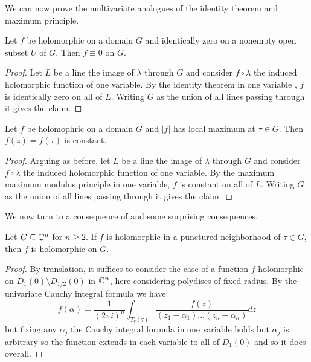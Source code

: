 We can now prove the multivariate analogues of the identity theorem and maximum principle. 
\begin{theorem}\label{thm: multivariate identity}
    Let $f$ be holomorphic on a domain $G$ and identically zero on a nonempty open subset $U$ of $G$. Then $f\equiv0$ on $G$. 
\end{theorem}
\begin{proof}
    Let $L$ be a line the image of $\lambda$ through $G$ and consider $f\circ\lambda$ the induced holomorphic function of one variable. By the identity theorem in one variable , $f$ is identically zero on all of $L$. Writing $G$ as the union of all lines passing through it gives the claim.  
\end{proof}
\begin{theorem}\label{thm: multivariate maximum modulus}
    Let $f$ be holomophric on a domain $G$ and $|f|$ has local maximum at $\tau\in G$. Then $f(z)=f(\tau)$ is constant.
\end{theorem}
\begin{proof}
    Arguing as before, let $L$ be a line the image of $\lambda$ through $G$ and consider $f\circ\lambda$ the induced holomorphic function of one variable. By the maximum maximum modulus principle in one variable, $f$ is constant on all of $L$. Writing $G$ as the union of all lines passing through it gives the claim. 
\end{proof}
We now turn to a consequence of  and some surprising consequences. 
\begin{proposition}\label{prop: holomorphic extensions over polyannuli}
    Let $G\subseteq\mathbb{C}^{n}$ for $n\geq2$. If $f$ is holomorphic in a punctured neighborhood of $\tau\in G$, then $f$ is holomorphic on $G$. 
\end{proposition}
\begin{proof}
    By translation, it suffices to consider the case of a function $f$ holomorphic on $D_{1}(0)\setminus\overline{D_{1/2}(0)}$ in $\mathbb{C}^{n}$, here considering polydiscs of fixed radius. By the univariate Cauchy integral formula we have 
    $$f(\alpha)=\frac{1}{(2\pi i)^{n}}\int_{T_{r}(\tau)}\frac{f(z)}{(z_{1}-\alpha_{1})\dots(z_{n}-\alpha_{n})}dz$$
    but fixing any $\alpha_{j}$ the Cauchy integral formula in one variable holds but $\alpha_{j}$ is arbitrary so the function extends in each variable to all of $D_{1}(0)$ and so it does overall. 
\end{proof}
